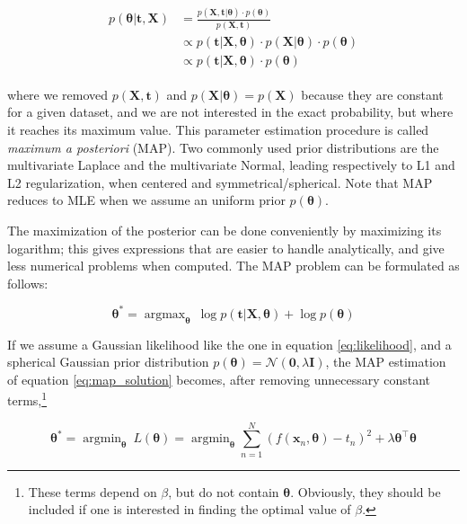 \documentclass[a4paper,11pt]{kth-mag}
\DeclareMathOperator*{\argmin}{argmin}
\DeclareMathOperator*{\argmax}{argmax}
\begin{document}
\begin{align}
\begin{split}
\label{eq:map}
p(\bm\theta\vert\bm t, \bm X)&=\frac{p(\bm X, \bm t\vert\bm\theta)\cdot p(\bm\theta)}{p(\bm X, \bm t)}\\
&\propto p(\bm t\vert \bm X,\bm\theta)\cdot p(\bm X\vert\bm\theta)\cdot p(\bm\theta)\\
&\propto p(\bm t\vert \bm X,\bm\theta)\cdot p(\bm\theta)
\end{split}
\end{align}

\noindent where we removed $p(\bm X,\bm t)$ and $p(\bm X\vert\bm\theta)=p(\bm X)$ because they are constant for a given dataset, and we are not interested in the exact probability, but where it reaches its maximum value. This parameter estimation procedure is called \emph{maximum a posteriori} (MAP). Two commonly used prior distributions are the multivariate Laplace and the multivariate Normal, leading respectively to L1 and L2 regularization, when centered and symmetrical/spherical. Note that MAP reduces to MLE when we assume an uniform prior $p(\bm\theta)$.

The maximization of the posterior can be done conveniently by maximizing its logarithm; this gives expressions that are easier to handle analytically, and give less numerical problems when computed. The MAP problem can be formulated as follows:

\begin{equation}
\label{eq:map_solution}
\bm\theta^*=\argmax_{\bm\theta}\ \log p(\bm t\vert\bm X,\bm\theta)+\log p(\bm\theta)
\end{equation}


If we assume a Gaussian likelihood like the one in equation \ref{eq:likelihood}, and a spherical Gaussian prior distribution $p(\bm\theta)=\mathcal{N}(\bm 0, \lambda\bm I)$, the MAP estimation of equation \ref{eq:map_solution} becomes, after removing unnecessary constant terms,\footnote{These terms depend on $\beta$, but do not contain $\bm\theta$. Obviously, they should be included if one is interested in finding the optimal value of $\beta$.}

\begin{equation}
\label{eq:least_squares}
\bm\theta^*=\argmin_{\bm\theta}\ L(\bm\theta)=\argmin_{\bm\theta}\sum_{n=1}^N\left( f(\bm x_n,\bm\theta)-t_n\right)^2+\lambda\bm\theta^\intercal\bm\theta
\end{equation}
\end{document}
